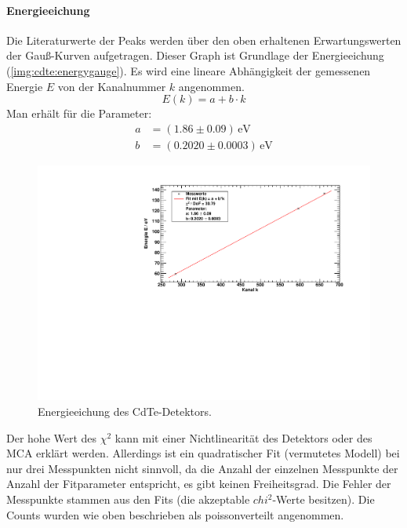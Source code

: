 \paragraph{Energieeichung}
Die Literaturwerte der Peaks werden über den oben erhaltenen Erwartungswerten der Gauß-Kurven aufgetragen. Dieser Graph ist Grundlage der 
Energieeichung (\autoref{img:cdte:energygauge}). Es wird eine lineare Abhängigkeit der gemessenen Energie $E$ von der Kanalnummer $k$ angenommen.
\begin{equation}
  E(k) = a + b \cdot k
\end{equation}
Man erhält für die Parameter:
\begin{equation}
\begin{split}
  a &= (1.86 \pm 0.09)\,\text{eV} \\
  b &= (0.2020 \pm 0.0003)\,\text{eV}
\end{split}
\end{equation}
\begin{figure}[H]
\begin{center}
  \includegraphics[width=\textwidth]{../img/part3/energygauge_CdTe.pdf}
  \caption{Energieeichung des CdTe-Detektors.}
  \label{img:cdte:energygauge}
\end{center}
\end{figure}
Der hohe Wert des $\chi^2$ kann mit einer Nichtlinearität des Detektors oder des MCA erklärt werden. Allerdings ist ein quadratischer Fit 
(vermutetes Modell) bei nur drei Messpunkten nicht sinnvoll, da die Anzahl der einzelnen Messpunkte der Anzahl der Fitparameter entspricht, es 
gibt keinen Freiheitsgrad. Die Fehler der Messpunkte stammen aus den Fits (die akzeptable $chi^2$-Werte besitzen). Die Counts 
wurden wie oben beschrieben als poissonverteilt angenommen.

